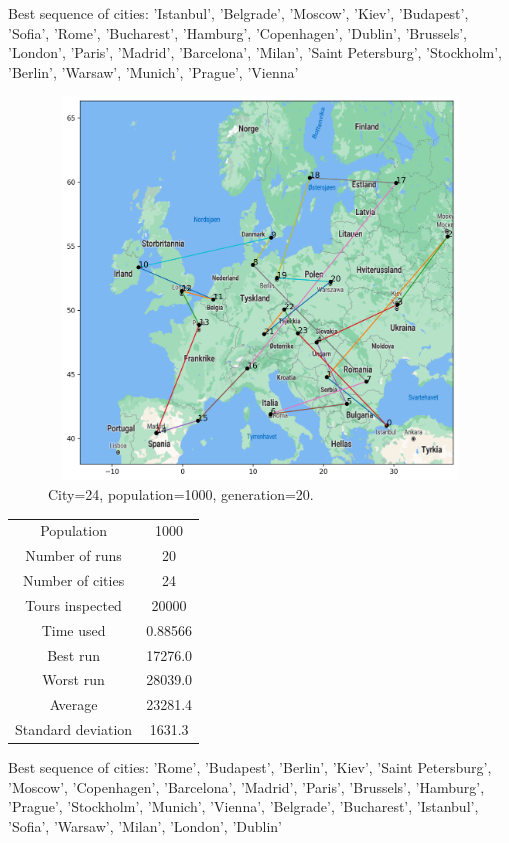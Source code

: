\documentclass[a4paper,12pt]{article}
\begin{document}
Best sequence of cities: 'Istanbul', 'Belgrade', 'Moscow', 'Kiev', 'Budapest', 'Sofia', 'Rome', 'Bucharest', 'Hamburg', 'Copenhagen', 'Dublin', 'Brussels', 'London', 'Paris', 'Madrid', 'Barcelona', 'Milan', 'Saint Petersburg', 'Stockholm', 'Berlin', 'Warsaw', 'Munich', 'Prague', 'Vienna'
\begin{figure}[H]
\centerline{\includegraphics[width=6in, height=4in]{geneticMap5.png}}
\caption{City=24, population=1000, generation=20.}
\label{fig}
\end{figure}

\begin{center}
\begin{tabular}{ c c}
 Population & 1000  \\ 
 Number of runs & 20  \\ 
 Number of cities & 24  \\  
Tours inspected & 20000  \\
 Time used & 0.88566   \\  
 Best run & 17276.0  \\ 
Worst run & 28039.0  \\ 
Average & 23281.4  \\ 
 Standard deviation & 1631.3   \\ 
\end{tabular}
\end{center}


Best sequence of cities: 'Rome', 'Budapest', 'Berlin', 'Kiev', 'Saint Petersburg', 'Moscow', 'Copenhagen', 'Barcelona', 'Madrid', 'Paris', 'Brussels', 'Hamburg', 'Prague', 'Stockholm', 'Munich', 'Vienna', 'Belgrade', 'Bucharest', 'Istanbul', 'Sofia', 'Warsaw', 'Milan', 'London', 'Dublin'
\end{document}
